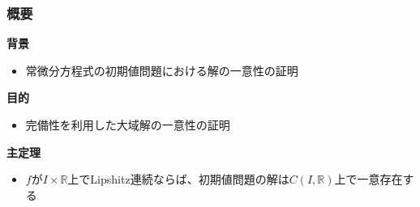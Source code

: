 \documentclass[aspectratio=169]{beamer}
\newenvironment{sectionblock}[1]{%
  \begin{minipage}{\textwidth}%
    \textbf{\large #1}\par\vspace{0.5em}%
}{%
  \end{minipage}\vspace{1em}%
}
\newcommand{\sectioncontent}[2]{%
  \begin{sectionblock}{#1}%
    \begin{itemize}%
      #2%
    \end{itemize}%
  \end{sectionblock}%
}
\begin{document}
\begin{frame}
  \frametitle{概要}
  
  \sectioncontent{背景}{%
    \item 常微分方程式の初期値問題における解の一意性の証明
  }
  
  \sectioncontent{目的}{%
    \item 完備性を利用した大域解の一意性の証明
  }
  
  \sectioncontent{主定理}{%
    \item $f$が$I \times \mathbb{R}$上でLipshitz連続ならば、初期値問題の解は$C(I,\mathbb{R})$上で一意存在する
  }
\end{frame}
\end{document}
